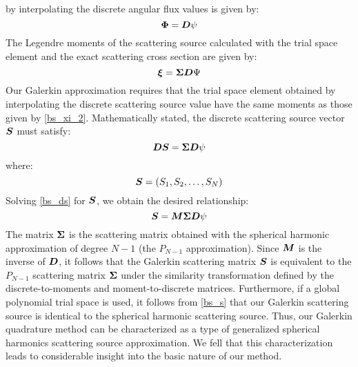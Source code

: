 by interpolating the discrete angular flux values is given by:
\begin{equation}
\boldsymbol{\Phi} = \boldsymbol{D}\psi
\end{equation}
The Legendre moments of the scattering source calculated with the trial space
element and the exact scattering cross section are given by:
\begin{equation}
\bs{\xi} = \bs{\Sigma D}\Psi
\label{bs_xi_2}
\end{equation}
Our Galerkin approximation requires that the trial space element obtained by
interpolating the discrete scattering source value have the same moments as
those given by \cref{bs_xi_2}. Mathematically stated, the discrete
scattering source vector $\boldsymbol{S}$ must satisfy:
\begin{equation}
\bs{DS} = \bs{\Sigma D}\psi
\label{bs_ds}
\end{equation}
where:
\begin{equation}
\boldsymbol{S} = (S_1,S_2,\hdots,S_N)
\end{equation}
Solving \cref{bs_ds} for $\boldsymbol{S}$, we obtain the desired
relationship:
\begin{equation}
\bs{S} = \bs{M\Sigma D}\psi
\label{bs_s}
\end{equation}
The matrix $\boldsymbol{\Sigma}$ is the scattering matrix obtained with the spherical
harmonic approximation of degree $N-1$ (the $P_{N-1}$ approximation). Since
$\boldsymbol{M}$ is the inverse of $\boldsymbol{D}$, it follows that the Galerkin scattering
matrix $\boldsymbol{S}$ is equivalent to the $P_{N-1}$ scattering matrix $\boldsymbol{\Sigma}$
under the similarity transformation defined by the discrete-to-moments and
moment-to-discrete matrices. Furthermore, if a global polynomial trial space
is used, it follows from \cref{bs_s} that our Galerkin scattering
source is identical to the spherical harmonic scattering source. Thus, our
Galerkin quadrature method can be characterized as a type of generalized
spherical harmonics scattering source approximation. We fell that this
characterization leads to considerable insight into the basic nature of our
method.

